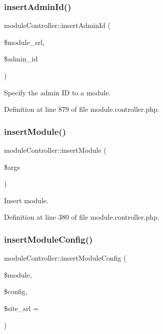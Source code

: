 \subsubsection{\texorpdfstring{insert\+Admin\+Id()}{insertAdminId()}}
{\footnotesize\ttfamily module\+Controller\+::insert\+Admin\+Id (\begin{DoxyParamCaption}\item[{}]{\$module\+\_\+srl,  }\item[{}]{\$admin\+\_\+id }\end{DoxyParamCaption})}



Specify the admin ID to a module. 



Definition at line 879 of file module.\+controller.\+php.

\hypertarget{classmoduleController_a8876924470cbfa94679d73dc6fc61332}{}\label{classmoduleController_a8876924470cbfa94679d73dc6fc61332} 
\subsubsection{\texorpdfstring{insert\+Module()}{insertModule()}}
{\footnotesize\ttfamily module\+Controller\+::insert\+Module (\begin{DoxyParamCaption}\item[{}]{\$args }\end{DoxyParamCaption})}



Insert module. 



Definition at line 380 of file module.\+controller.\+php.

\hypertarget{classmoduleController_a678c87caaf6b2d12e63237d87b11b7a9}{}\label{classmoduleController_a678c87caaf6b2d12e63237d87b11b7a9} 
\subsubsection{\texorpdfstring{insert\+Module\+Config()}{insertModuleConfig()}}
{\footnotesize\ttfamily module\+Controller\+::insert\+Module\+Config (\begin{DoxyParamCaption}\item[{}]{\$module,  }\item[{}]{\$config,  }\item[{}]{\$site\+\_\+srl = {} }\end{DoxyParamCaption})}



